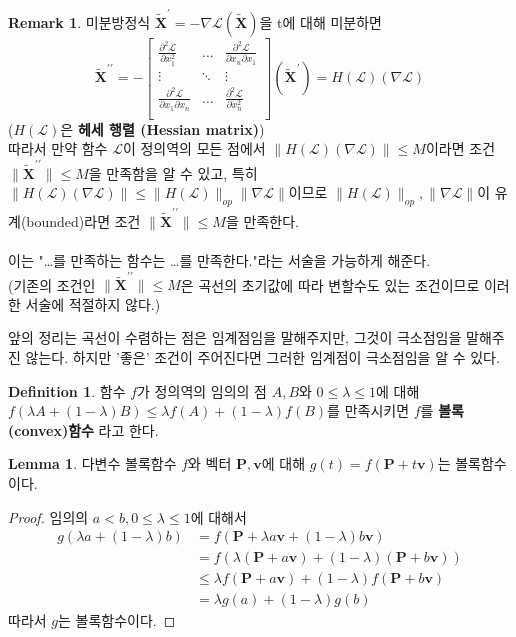 \documentclass[a4paper,20pt]{article}
\theoremstyle{definition}
\newtheorem{definition}{Definition}[section]
\newtheorem{lemma}[theorem]{Lemma}
\newtheorem*{remark}{Remark}
\newcommand{\curve}[1][X]{\tilde{\mathbf{#1}}}
\begin{document}
\begin{remark}
미분방정식 $\curve^{\prime}=-\nabla\mathcal{L}(\curve)$을 t에 대해 미분하면
$$
\curve^{\prime \prime}= -\left[ 
	\begin{array}{ccc}
	\frac{\partial^{2}\mathcal{L}}{\partial x_{1}^{2}} & \ldots & \frac{\partial^{2}\mathcal{L}}{\partial x_{n} \partial x_{1}} \\
	\vdots & \ddots & \vdots \\
	\frac{\partial^{2}\mathcal{L}}{\partial x_{1} \partial x_{n}} & \ldots & \frac{\partial^{2}\mathcal{L}}{\partial x_{n}^{2}} \\
	\end{array}
\right] (\curve^{\prime})
=H(\mathcal{L})(\nabla\mathcal{L})
$$
($H(\mathcal{L})$은 \textbf{헤세 행렬 (Hessian matrix)}) \\
따라서 만약 함수 $\mathcal{L}$이 정의역의 모든 점에서 $\|H(\mathcal{L})(\nabla\mathcal{L})\|\leq M$이라면 조건 $\|\curve^{\prime \prime}\|\leq M$을 만족함을 알 수 있고, 특히 $\|H(\mathcal{L})(\nabla\mathcal{L})\|\leq \|H(\mathcal{L})\|_{op}\|\nabla\mathcal{L}\|$이므로 $\|H(\mathcal{L})\|_{op}, \|\nabla\mathcal{L}\|$이 유계(bounded)라면 조건 $\|\curve^{\prime \prime}\|\leq M$을 만족한다.
\\\\
이는 "\ldots 를 만족하는 함수는 \ldots 를 만족한다."라는 서술을 가능하게 해준다. \\
(기존의 조건인 $\|\curve^{\prime \prime}\|\leq M$은 곡선의 초기값에 따라 변할수도 있는 조건이므로 이러한 서술에 적절하지 않다.)

\end{remark}


앞의 정리는 곡선이 수렴하는 점은 임계점임을 말해주지만, 그것이 극소점임을 말해주진 않는다. 	하지만 '좋은' 조건이 주어진다면 그러한 임계점이 극소점임을 알 수 있다.

\newpage
\begin{definition}
함수 $f$가 정의역의 임의의 점 $A,B$와 $0\leq \lambda \leq 1$에 대해 \\ $f(\lambda A + (1-\lambda) B) \leq \lambda f(A) + (1-\lambda) f(B)$를 만족시키면 $f$를 \textbf{볼록(convex)함수} 라고 한다.
\end{definition}

\begin{lemma}
다변수 볼록함수 $f$와 벡터 $\mathbf{P},\mathbf{v}$에 대해 $g(t)=f(\mathbf{P}+t\mathbf{v})$는 볼록함수이다.
\end{lemma}
\begin{proof}
임의의 $a<b, 0\leq\lambda\leq 1$에 대해서 
\begin{align*}
g(\lambda a+(1-\lambda) b)&=f(\mathbf{P}+\lambda a\mathbf{v}+(1-\lambda) b\mathbf{v})\\&=f(\lambda(\mathbf{P}+a\mathbf{v})+(1-\lambda)(\mathbf{P}+b\mathbf{v}))\\&\leq\lambda f(\mathbf{P}+a\mathbf{v})+(1-\lambda)f(\mathbf{P}+b\mathbf{v})\\&=\lambda g(a)+(1-\lambda) g(b)
\end{align*}
따라서 $g$는 볼록함수이다.
\end{proof}
\end{document}
